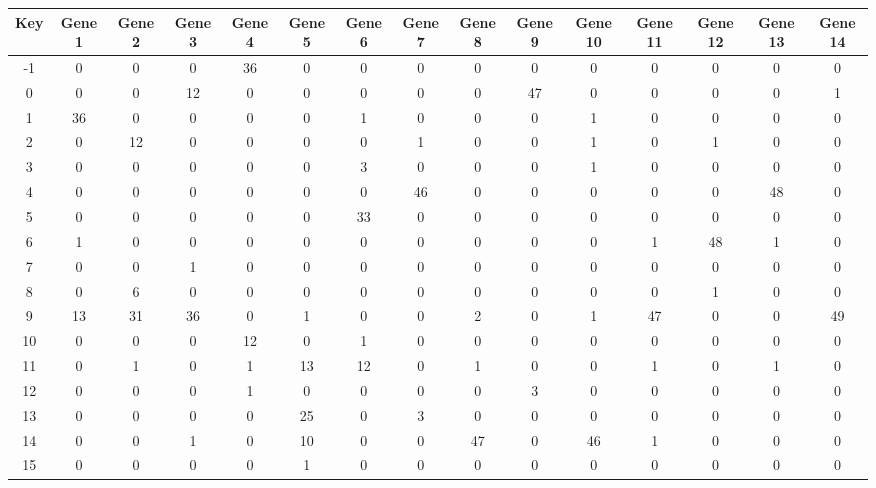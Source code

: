 \begin{tabular}{|c|c|c|c|c|c|c|c|c|c|c|c|c|c|c|}
\hline
Key & Gene 1 & Gene 2 & Gene 3 & Gene 4 & Gene 5 & Gene 6 & Gene 7 & Gene 8 & Gene 9 & Gene 10 & Gene 11 & Gene 12 & Gene 13 & Gene 14 \\
\hline
-1 & 0 & 0 & 0 & 36 & 0 & 0 & 0 & 0 & 0 & 0 & 0 & 0 & 0 & 0 \\
0 & 0 & 0 & 12 & 0 & 0 & 0 & 0 & 0 & 47 & 0 & 0 & 0 & 0 & 1 \\
1 & 36 & 0 & 0 & 0 & 0 & 1 & 0 & 0 & 0 & 1 & 0 & 0 & 0 & 0 \\
2 & 0 & 12 & 0 & 0 & 0 & 0 & 1 & 0 & 0 & 1 & 0 & 1 & 0 & 0 \\
3 & 0 & 0 & 0 & 0 & 0 & 3 & 0 & 0 & 0 & 1 & 0 & 0 & 0 & 0 \\
4 & 0 & 0 & 0 & 0 & 0 & 0 & 46 & 0 & 0 & 0 & 0 & 0 & 48 & 0 \\
5 & 0 & 0 & 0 & 0 & 0 & 33 & 0 & 0 & 0 & 0 & 0 & 0 & 0 & 0 \\
6 & 1 & 0 & 0 & 0 & 0 & 0 & 0 & 0 & 0 & 0 & 1 & 48 & 1 & 0 \\
7 & 0 & 0 & 1 & 0 & 0 & 0 & 0 & 0 & 0 & 0 & 0 & 0 & 0 & 0 \\
8 & 0 & 6 & 0 & 0 & 0 & 0 & 0 & 0 & 0 & 0 & 0 & 1 & 0 & 0 \\
9 & 13 & 31 & 36 & 0 & 1 & 0 & 0 & 2 & 0 & 1 & 47 & 0 & 0 & 49 \\
10 & 0 & 0 & 0 & 12 & 0 & 1 & 0 & 0 & 0 & 0 & 0 & 0 & 0 & 0 \\
11 & 0 & 1 & 0 & 1 & 13 & 12 & 0 & 1 & 0 & 0 & 1 & 0 & 1 & 0 \\
12 & 0 & 0 & 0 & 1 & 0 & 0 & 0 & 0 & 3 & 0 & 0 & 0 & 0 & 0 \\
13 & 0 & 0 & 0 & 0 & 25 & 0 & 3 & 0 & 0 & 0 & 0 & 0 & 0 & 0 \\
14 & 0 & 0 & 1 & 0 & 10 & 0 & 0 & 47 & 0 & 46 & 1 & 0 & 0 & 0 \\
15 & 0 & 0 & 0 & 0 & 1 & 0 & 0 & 0 & 0 & 0 & 0 & 0 & 0 & 0 \\
\hline
\end{tabular}